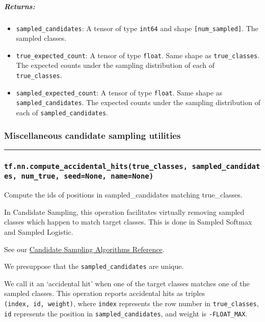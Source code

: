 \subparagraph{Returns: }\label{returns-28}

\begin{itemize}
\tightlist
\item
  \texttt{sampled\_candidates}: A tensor of type \texttt{int64} and
  shape \texttt{{[}num\_sampled{]}}. The sampled classes.
\item
  \texttt{true\_expected\_count}: A tensor of type \texttt{float}. Same
  shape as \texttt{true\_classes}. The expected counts under the
  sampling distribution of each of \texttt{true\_classes}.
\item
  \texttt{sampled\_expected\_count}: A tensor of type \texttt{float}.
  Same shape as \texttt{sampled\_candidates}. The expected counts under
  the sampling distribution of each of \texttt{sampled\_candidates}.
\end{itemize}

\subsubsection{Miscellaneous candidate sampling utilities
}\label{miscellaneous-candidate-sampling-utilities}

\begin{center}\rule{0.5\linewidth}{\linethickness}\end{center}

\subsubsection{\texorpdfstring{\texttt{tf.nn.compute\_accidental\_hits(true\_classes,\ sampled\_candidates,\ num\_true,\ seed=None,\ name=None)}
}{tf.nn.compute\_accidental\_hits(true\_classes, sampled\_candidates, num\_true, seed=None, name=None) }}\label{tf.nn.computeux5faccidentalux5fhitstrueux5fclasses-sampledux5fcandidates-numux5ftrue-seednone-namenone}

Compute the ids of positions in sampled\_candidates matching
true\_classes.

In Candidate Sampling, this operation facilitates virtually removing
sampled classes which happen to match target classes. This is done in
Sampled Softmax and Sampled Logistic.

See our
\href{http://www.tensorflow.org/extras/candidate_sampling.pdf}{Candidate
Sampling Algorithms Reference}.

We presuppose that the \texttt{sampled\_candidates} are unique.

We call it an `accidental hit' when one of the target classes matches
one of the sampled classes. This operation reports accidental hits as
triples \texttt{(index,\ id,\ weight)}, where \texttt{index} represents
the row number in \texttt{true\_classes}, \texttt{id} represents the
position in \texttt{sampled\_candidates}, and weight is
\texttt{-FLOAT\_MAX}.

